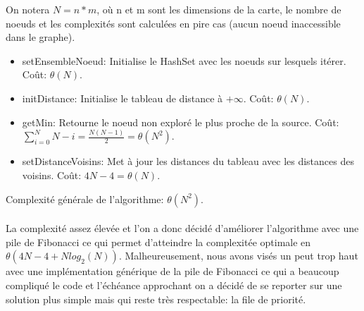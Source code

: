 \documentclass[12pt,a4paper]{article}
\begin{document}
On notera $N = n*m$, où n et m sont les dimensions de la carte, le nombre de noeuds et les complexités sont calculées en pire cas (aucun noeud inaccessible dans le graphe).
\begin{itemize}
	\item setEnsembleNoeud: Initialise le HashSet avec les noeuds sur lesquels itérer. Coût: $\theta(N)$.
	\item initDistance: Initialise le tableau de distance à $+\infty$. Coût: $\theta(N)$.
	\item getMin: Retourne le noeud non exploré le plus proche de la source. Coût: $\sum\limits_{i=0}^{N}{N-i} = \frac{N(N-1)}{2} = \theta(N^2)$.
	\item setDistanceVoisins: Met à jour les distances du tableau avec les distances des voisins. Coût: $4N-4 = \theta(N)$.\\
\end{itemize}
Complexité générale de l'algorithme: $\theta(N^2)$.\\\\
La complexité assez élevée et l'on a donc décidé d'améliorer l'algorithme avec une pile de Fibonacci ce qui permet d'atteindre la complexitée optimale en $\theta(4N-4 + Nlog_2(N))$. Malheureusement, nous avons visés un peut trop haut avec une implémentation générique de la pile de Fibonacci ce qui a beaucoup compliqué le code et l'échéance approchant on a décidé de se reporter sur une solution plus simple mais qui reste très respectable: la file de priorité.\\
\end{document}
